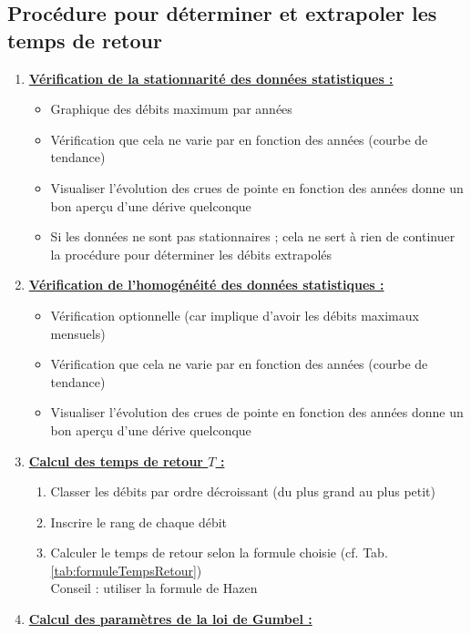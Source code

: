 \subsection{Procédure pour déterminer et extrapoler les temps de retour}
\begin{enumerate}
    \item \textbf{\underline{Vérification de la stationnarité des données statistiques :}} \\
    \begin{itemize}
        \item Graphique des débits maximum par années
        \item Vérification que cela ne varie par en fonction des années (courbe de tendance)
        \item Visualiser l'évolution des crues de pointe en fonction des années donne un bon aperçu d'une dérive quelconque
        \item \Warning Si les données ne sont pas stationnaires ; cela ne sert à rien de continuer la procédure pour déterminer les débits extrapolés
    \end{itemize}
    \bigskip
    \item \textbf{\underline{Vérification de l'homogénéité des données statistiques :}}
    \begin{itemize}
        \item Vérification optionnelle (car implique d'avoir les débits maximaux mensuels)
        \item Vérification que cela ne varie par en fonction des années (courbe de tendance)
        \item Visualiser l'évolution des crues de pointe en fonction des années donne un bon aperçu d'une dérive quelconque
    \end{itemize}
    \bigskip
    \item \textbf{\underline{Calcul des temps de retour $T$ :}}
    \begin{enumerate}
        \item Classer les débits par ordre décroissant (du plus grand au plus petit)
        \item Inscrire le rang de chaque débit
        \item Calculer le temps de retour selon la formule choisie (cf. Tab. \ref{tab:formuleTempsRetour}) \\
        Conseil : utiliser la formule de Hazen
    \end{enumerate}
    \item \textbf{\underline{Calcul des paramètres de la loi de Gumbel :}} \\

\end{enumerate}
